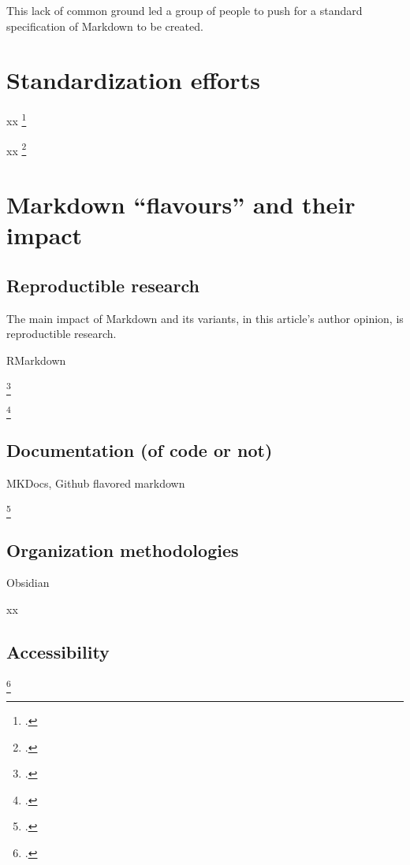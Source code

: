 This lack of common ground led a group of people to push for a standard specification of Markdown to be created.

\section{Standardization efforts}

xx \footcite{leonard2016text}

xx \footcite{commonmark}

\section{Markdown ``flavours'' and their impact}

\subsection{Reproductible research}

The main impact of Markdown and its variants, in this article's author opinion, is reproductible research.

RMarkdown

\footcite{voegler2014markdown}

\footcite{racine2019energy}

\subsection{Documentation (of code or not)}

MKDocs,
Github flavored markdown

\footcite{kopp2018markdown}

\subsection{Organization methodologies}

Obsidian

xx

\subsection{Accessibility}

\footcite{oelen2019content}